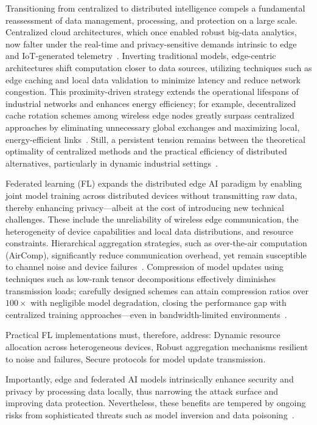 \documentclass[sigconf]{acmart}
\begin{document}
Transitioning from centralized to distributed intelligence compels a fundamental reassessment of data management, processing, and protection on a large scale. Centralized cloud architectures, which once enabled robust big-data analytics, now falter under the real-time and privacy-sensitive demands intrinsic to edge and IoT-generated telemetry~\cite{ref10,ref11}. Inverting traditional models, edge-centric architectures shift computation closer to data sources, utilizing techniques such as edge caching and local data validation to minimize latency and reduce network congestion. This proximity-driven strategy extends the operational lifespans of industrial networks and enhances energy efficiency; for example, decentralized cache rotation schemes among wireless edge nodes greatly surpass centralized approaches by eliminating unnecessary global exchanges and maximizing local, energy-efficient links~\cite{ref11}. Still, a persistent tension remains between the theoretical optimality of centralized methods and the practical efficiency of distributed alternatives, particularly in dynamic industrial settings~\cite{ref10,ref11}.

Federated learning (FL) expands the distributed edge AI paradigm by enabling joint model training across distributed devices without transmitting raw data, thereby enhancing privacy—albeit at the cost of introducing new technical challenges. These include the unreliability of wireless edge communication, the heterogeneity of device capabilities and local data distributions, and resource constraints. Hierarchical aggregation strategies, such as over-the-air computation (AirComp), significantly reduce communication overhead, yet remain susceptible to channel noise and device failures~\cite{ref23}. Compression of model updates using techniques such as low-rank tensor decompositions effectively diminishes transmission loads; carefully designed schemes can attain compression ratios over $100\times$ with negligible model degradation, closing the performance gap with centralized training approaches—even in bandwidth-limited environments~\cite{ref23}.

Practical FL implementations must, therefore, address:
Dynamic resource allocation across heterogeneous devices,
Robust aggregation mechanisms resilient to noise and failures,
Secure protocols for model update transmission.

Importantly, edge and federated AI models intrinsically enhance security and privacy by processing data locally, thus narrowing the attack surface and improving data protection. Nevertheless, these benefits are tempered by ongoing risks from sophisticated threats such as model inversion and data poisoning~\cite{ref17,ref19,ref23,ref24}.
\end{document}
